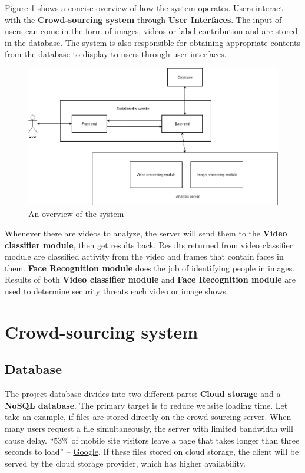 Figure \ref{chap3:system_overview_basic} shows a concise overview of how the system operates. Users interact with the \textbf{Crowd-sourcing system} through \textbf{User Interfaces}. The input of users can come in the form of images, videos or label contribution and are stored in the database. The system is also responsible for obtaining appropriate contents from the database to display to users through user interfaces.

\begin{center}
    \begin{figure}[H]
    \centering
    \includegraphics[width=1\columnwidth]{images/chap3/system_overview_basic.png}
    \caption{An overview of the system}
    \label{chap3:system_overview_basic}
    \end{figure}
\end{center}

Whenever there are videos to analyze, the server will send them to the \textbf{Video classifier module}, then get results back. Results returned from video classifier module are classified activity from the video and frames that contain faces in them. \textbf{Face Recognition module} does the job of identifying people in images. Results of both \textbf{Video classifier module} and \textbf{Face Recognition module} are used to determine security threats each video or image shows.
\section{Crowd-sourcing system}
\subsection{Database}
The project database divides into two different parts: \textbf{Cloud storage} and a \textbf{NoSQL database}. The primary target is to reduce website loading time. Let take an example, if files are stored directly on the crowd-sourcing server. When many users request a file simultaneously, the server with limited bandwidth will cause delay. “53\% of mobile site visitors leave a page that takes longer than three seconds to load” – \href{https://think.storage.googleapis.com/docs/mobile-page-speed-new-industry-benchmarks.pdf}{Google}. If these files stored on cloud storage, the client will be served by the cloud storage provider, which has higher availability.
